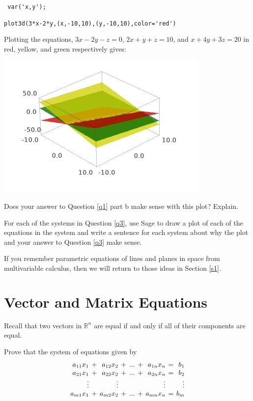 \verb" var('x,y'); "

\verb"plot3d(3*x-2*y,(x,-10,10),(y,-10,10),color='red') "

Plotting the equations, $3x-2y-z=0$, $2x+y+z=10$, and $x+4y+3z=20$ in red, yellow, and green respectively gives:

\begin{center}\includegraphics[scale=1.5]{3planeplot.png}\end{center}

\begin{question} Does your answer to Question \ref{q1} part b make sense with this plot? Explain.
\end{question}

\bq For each of the systems in Question \ref{q3}, use Sage to draw a plot of each of the equations in the system and write a sentence for each system about why the plot and your answer to Question \ref{q3} make sense.
\eq

If you remember parametric equations of lines and planes in space from multivariable calculus, then we will return to those ideas in Section \ref{s1}.

\section{Vector and Matrix Equations}
Recall that two vectors in $\mathbb{R}^n$ are equal if and only if all of their components are equal.

\bq\label{q41} Prove that the system of equations given by
\begin{equation*}
\setlength{\arraycolsep}{2pt}
\begin{array}{rcrcrcrcr}
  a_{11} x_1  &+& a_{12} x_2 &+& ... &+&  a_{1n}x_n &=& b_1 \\ %
  a_{21} x_1  &+& a_{22} x_2 &+& ... &+&  a_{2n}x_n &=& b_2 \\
  \vdots  & & \vdots & &  & &  \vdots && \vdots \\
  a_{m1} x_1  &+& a_{m2} x_2 &+& ... &+&  a_{mn}x_n &=& b_m
\end{array}
\end{equation*}

